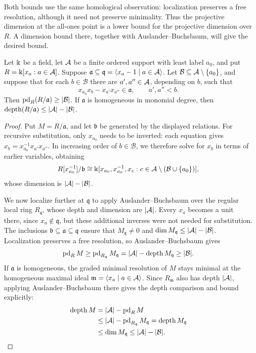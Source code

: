 Both bounds use the same homological observation: localization preserves
a free resolution, although it need not preserve minimality. Thus the
projective dimension at the all-ones point is a lower bound for the
projective dimension over $R$. A dimension bound there, together with
Auslander--Buchsbaum, will give the desired bound.

\begin{lemma}\label{depth:triangular}
Let $\Bbbk$ be a field, let $\mathcal A$ be a finite ordered support with least label $a_0$, and put
$R=\Bbbk[x_a:a\in\mathcal A]$. Suppose
$\mathfrak a\subseteq\mathfrak q=\langle x_a-1\mid a\in\mathcal A\rangle$.
Let $\mathcal B\subseteq\mathcal A\setminus\{a_0\}$, and suppose that for each
$b\in\mathcal B$ there are $a',a''\in\mathcal A$, depending on $b$, such that
\[
 x_{a_0}x_b-x_{a'}x_{a''}\in\mathfrak a,\qquad a',a''<b.
\]
Then $\operatorname{pd}_R(R/\mathfrak a)\ge|\mathcal B|$. If $\mathfrak a$ is homogeneous in monomial degree,
then $\operatorname{depth}(R/\mathfrak a)\le|\mathcal A|-|\mathcal B|$.
\end{lemma}
\begin{proof}
Put $M=R/\mathfrak a$, and let $\mathfrak b$ be generated by the displayed
relations. For recursive substitution, only $x_{a_0}$ needs to be inverted:
each equation gives $x_b=x_{a_0}^{-1}x_{a'}x_{a''}$. In increasing order
of $b\in\mathcal B$, we therefore solve for $x_b$ in terms of earlier
variables, obtaining
\[
 R[x_{a_0}^{-1}]/\mathfrak b\cong
 \Bbbk[x_{a_0},x_{a_0}^{-1},x_c:c\in\mathcal A\setminus(\mathcal B\cup\{a_0\})],
\]
whose dimension is $|\mathcal A|-|\mathcal B|$.

We now localize further at $\mathfrak q$ to apply Auslander--Buchsbaum
over the regular local ring $R_{\mathfrak q}$, whose depth and dimension
are $|\mathcal A|$. Every $x_a$ becomes a unit there, since $x_a\notin\mathfrak q$,
but these additional inverses were not needed for substitution.
The inclusions $\mathfrak b\subseteq\mathfrak a\subseteq\mathfrak q$
ensure that $M_{\mathfrak q}\ne0$ and
$\dim M_{\mathfrak q}\le|\mathcal A|-|\mathcal B|$.
Localization preserves a free resolution, so Auslander--Buchsbaum gives
\[
 \operatorname{pd}_R M\ge\operatorname{pd}_{R_{\mathfrak q}}M_{\mathfrak q}
 =|\mathcal A|-\operatorname{depth}M_{\mathfrak q}\ge|\mathcal B|.
\]
If $\mathfrak a$ is homogeneous, the graded minimal resolution of $M$
stays minimal at the homogeneous maximal ideal
$\mathfrak m=\langle x_a\mid a\in\mathcal A\rangle$. Since $R_{\mathfrak m}$
also has depth $|\mathcal A|$, applying Auslander--Buchsbaum there gives the
depth comparison and bound explicitly:
\[
 \begin{aligned}
 \operatorname{depth}M
 &=|\mathcal A|-\operatorname{pd}_R M\\
 &\le|\mathcal A|-\operatorname{pd}_{R_{\mathfrak q}}M_{\mathfrak q}
   =\operatorname{depth}M_{\mathfrak q}\\
 &\le\dim M_{\mathfrak q}\le|\mathcal A|-|\mathcal B|.
 \end{aligned}\qedhere
\]
\end{proof}


